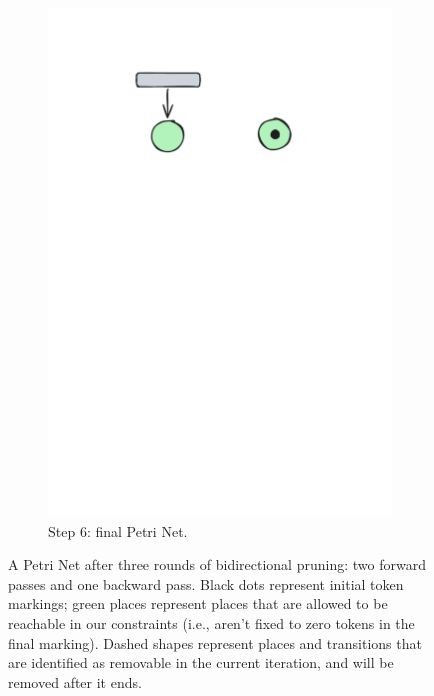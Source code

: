 \begin{figure}[!htbp]
\begin{subfigure}[b][\subfigheight][b]{0.23\textwidth}
		\includegraphics[width=\textwidth]{plots/bidirectional_pruning_step_e_updated_2.pdf}
		\caption{Step 6: final Petri Net.}
		\label{fig:step:e}
	\end{subfigure}
	
	\caption{A Petri Net after three rounds of bidirectional pruning: two forward passes and one backward pass. Black dots represent initial token markings; green places represent places that are allowed to be reachable in our constraints (i.e., aren't fixed to zero tokens in the final marking). Dashed shapes represent places and transitions that are identified as removable in the current iteration, and will be removed after it ends.}
	\label{fig:bidirectional_pruning}
\end{figure}

